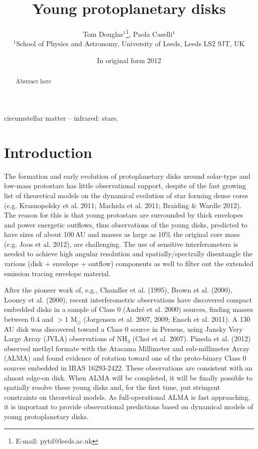 \documentclass[useAMS,usenatbib]{mn2e}
\title[Simulated observations of young protoplanetary disks]{Young protoplanetary disks}
\author[Tom  Douglas, Paola Caselli, Et al.]{Tom Douglas$^{1}$\thanks{E-mail:
pytd@leeds.ac.uk}, Paola Caselli$^{1}$\\
$^{1}$School of Physics and Astronomy, University of Leeds, Leeds LS2 9JT, UK}
\begin{document}
\date{In original form 2012}

\pagerange{\pageref{firstpage}--\pageref{lastpage}} 

\maketitle

\label{firstpage}

\begin{abstract}
Abstract here
\end{abstract}

\begin{keywords}
circumstellar matter -- infrared: stars.
\end{keywords}

\section{Introduction}

The formation and early evolution of protoplanetary disks around solar-type and low-mass protostars has little observational support, despite of the fast growing list of theoretical models on the dynamical evolution of star forming dense cores (e.g. Krasnopolsky et al. 2011; Machida et al. 2011; Braiding \& Wardle 2012). The reason for this is that young protostars are surrounded by thick envelopes and power energetic outflows, thus observations of the young disks, predicted to have sizes of about 100\,AU and masses as large as 10\% the original core mass (e.g. Joos et al. 2012), are challenging. The use of sensitive interferometers is needed to achieve high angular resolution and spatially/spectrally disentangle the various (disk + envelope + outflow) components as well to filter out the extended emission tracing envelope material. 

After the pioneer work of, e.g., Chandler et al. (1995), Brown et al. (2000), Looney et al. (2000), recent interferometric observations have discovered compact embedded disks in a sample of Class 0 (Andr\'e et al. 2000) sources, finding masses between 0.4 and  $>$1 M$_{\odot}$ (Jorgensen et al. 2007, 2009; Enoch et al. 2011). A 130\,AU disk was discovered toward a Class 0 source in Perseus, using Jansky Very Large Array (JVLA) observations of NH$_3$ (Choi et al. 2007). Pineda et al. (2012) observed methyl formate with the Atacama Millimeter and sub-millimeter Array (ALMA) and found evidence of rotation toward one of the proto-binary Class 0 sources embedded in IRAS 16293-2422. These observations are consistent with an almost edge-on disk. When ALMA will be completed, it will be finally possible to spatially resolve these young disks and, for the first time, put stringent constraints on theoretical models. As full-operational ALMA is fast approaching, it is important to provide observational predictions based on dynamical models of young protoplanetary disks. 
\end{document}
